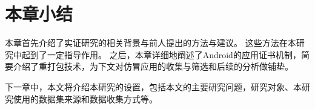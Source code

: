 \section{本章小结}
本章首先介绍了实证研究的相关背景与前人提出的方法与建议。
这些方法在本研究中起到了一定指导作用。
之后，本章详细地阐述了Android的应用证书机制，简要介绍了重打包技术，为下文对仿冒应用的收集与筛选和后续的分析做铺垫。

下一章中，本文将介绍本研究的设置，包括本文的主要研究问题，研究对象、本研究使用的数据集来源和数据收集方式等。


